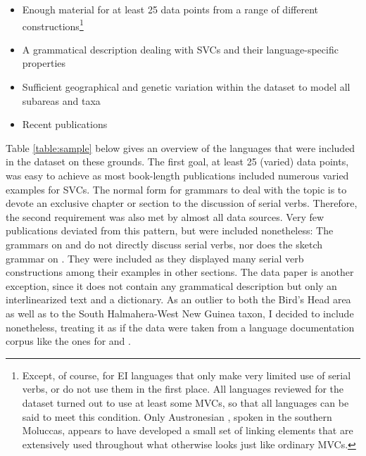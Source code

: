 \begin{footnotesize}
\begin{itemize}
\item Enough material for at least 25 data points from a range of different constructions\footnote{Except, of course, for EI languages that only make very limited use of serial verbs, or do not use them in the first place. All languages reviewed for the dataset turned out to use at least some MVCs, so that all languages can be said to meet this condition. Only Austronesian , spoken in the southern Moluccas, appears to have developed a small set of linking elements that are extensively used throughout what otherwise looks just like ordinary MVCs.}
\item A grammatical description dealing with SVCs and their language-specific properties
\item Sufficient geographical and genetic variation within the dataset to model all subareas and taxa
\item Recent publications
\end{itemize}
\end{footnotesize}

Table \ref{table:sample} below gives an overview of the languages that were included in the dataset on these grounds. The first goal, at least 25 (varied) data points, was easy to achieve as most book-length publications included numerous varied examples for SVCs. The normal form for grammars to deal with the topic is to devote an exclusive chapter or section to the discussion of serial verbs. Therefore, the second requirement was also met by almost all data sources. Very few publications deviated from this pattern, but were included nonetheless: The grammars on  \citep{berry1999} and  \citep{huber2011} do not directly discuss serial verbs, nor does the sketch grammar on  \citep{dalrymple2012}. They were included as they displayed many serial verb constructions among their examples in other sections. The  data paper \citep{kamholz2009} is another exception, since it does not contain any grammatical description but only an interlinearized text and a dictionary. As an outlier to both the Bird's Head area as well as to the South Halmahera-West New Guinea taxon, I decided to include  nonetheless, treating it as if the data were taken from a language documentation corpus like the ones for  and .

